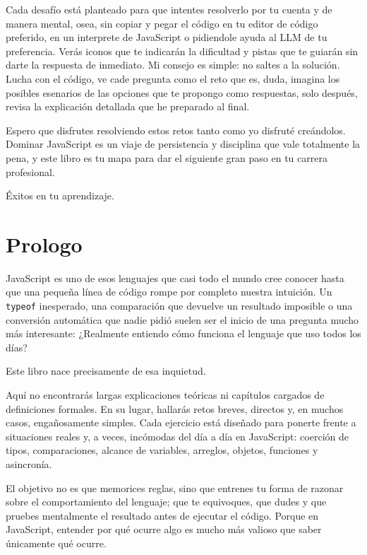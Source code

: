 \documentclass[
  letterpaper,
  DIV=11,
  numbers=noendperiod]{scrreprt}
\begin{document}

Cada desafío está planteado para que intentes resolverlo por tu cuenta y
de manera mental, osea, sin copiar y pegar el código en tu editor de
código preferido, en un interprete de JavaScript o pidiendole ayuda al
LLM de tu preferencia. Verás iconos que te indicarán la dificultad y
pistas que te guiarán sin darte la respuesta de inmediato. Mi consejo es
simple: no saltes a la solución. Lucha con el código, ve cade pregunta
como el reto que es, duda, imagina los posibles esenarios de las
opciones que te propongo como respuestas, solo después, revisa la
explicación detallada que he preparado al final.

Espero que disfrutes resolviendo estos retos tanto como yo disfruté
creándolos. Dominar JavaScript es un viaje de persistencia y disciplina
que vale totalmente la pena, y este libro es tu mapa para dar el
siguiente gran paso en tu carrera profesional.

Éxitos en tu aprendizaje.


\chapter*{Prologo}\label{prologo}


JavaScript es uno de esos lenguajes que casi todo el mundo cree conocer
hasta que una pequeña línea de código rompe por completo nuestra
intuición. Un \texttt{typeof} inesperado, una comparación que devuelve
un resultado imposible o una conversión automática que nadie pidió
suelen ser el inicio de una pregunta mucho más interesante: ¿Realmente
entiendo cómo funciona el lenguaje que uso todos los días?

Este libro nace precisamente de esa inquietud.

Aquí no encontrarás largas explicaciones teóricas ni capítulos cargados
de definiciones formales. En su lugar, hallarás retos breves, directos
y, en muchos casos, engañosamente simples. Cada ejercicio está diseñado
para ponerte frente a situaciones reales y, a veces, incómodas del día a
día en JavaScript: coerción de tipos, comparaciones, alcance de
variables, arreglos, objetos, funciones y asincronía.

El objetivo no es que memorices reglas, sino que entrenes tu forma de
razonar sobre el comportamiento del lenguaje; que te equivoques, que
dudes y que pruebes mentalmente el resultado antes de ejecutar el
código. Porque en JavaScript, entender por qué ocurre algo es mucho más
valioso que saber únicamente qué ocurre.
\end{document}
